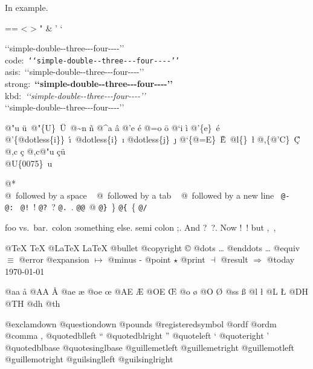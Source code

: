 \documentclass{book}
\makeatletter
\newcommand\GNUTexinfocommandstyletextkbd[1]{{\ttfamily\textsl{#1}}}%
\newenvironment{GNUTexinfopreformatted}{%
  \par\GNUTobeylines\obeyspaces\frenchspacing
  \parskip=\z@\parindent=\z@}{}
{\catcode`\^^M=13 \gdef\GNUTobeylines{\catcode`\^^M=13 \def^^M{\null\par}}}
\newenvironment{GNUTexinfoindented}
  {\begin{list}{}{}
  \item\relax}
  {\end{list}}
\makeatother
\begin{document}
In example.
\begin{GNUTexinfoindented}
\begin{GNUTexinfopreformatted}%
\ttfamily 
<
>
"
\&
'
`

{`}{`}simple-double{-}{-}three{-}{-}{-}four{-}{-}{-}-{'}{'}\leavevmode{}\\
code:\ \texttt{{`}{`}simple-double{-}{-}three{-}{-}{-}four{-}{-}{-}-{'}{'}}\ \leavevmode{}\\
asis:\ {`}{`}simple-double{-}{-}three{-}{-}{-}four{-}{-}{-}-{'}{'}\ \leavevmode{}\\
strong:\ \textbf{{`}{`}simple-double{-}{-}three{-}{-}{-}four{-}{-}{-}-{'}{'}}\ \leavevmode{}\\
kbd:\ \GNUTexinfocommandstyletextkbd{{`}{`}simple-double{-}{-}three{-}{-}{-}four{-}{-}{-}-{'}{'}}\ \leavevmode{}\\

`\hbox{}`simple-double-\hbox{}-three{-}{-}{-}four{-}{-}{-}-'\hbox{}'\leavevmode{}\\

%
%
%
%

@"u \"{u}\ 
@"\{U\}\ \"{U}\ 
@\~{}n \~{n}
@\^{}a \^{a}
@'e \'{e}
@=o \={o}
@`i \`{i}
@'\{e\}\ \'{e}
@'\{@dotless\{i\}\}\ \'{\i{}}\ 
@dotless\{i\}\ \i{}
@dotless\{j\}\ \j{}
@`\{@=E\}\ \`{\={E}}\ 
@l\{\}\ \l{}
@,\{@'C\}\ \c{\'{C}}
@,c \c{c}
@,c@"u \c{c}\"{u}\ \leavevmode{}\\

@U\{0075\}\ u

@* \leavevmode{}\\
@\ followed by a space
\ {}
@\ followed by a tab
\ {}
@\ followed by a new line
\ {}\texttt{@-}\ \-{}
\texttt{@:}\ \@
\texttt{@!}\ \@!
\texttt{@?}\ \@?
\texttt{@.}\ \@.
\texttt{@@}\ @
\texttt{@\}}\ \}
\texttt{@\{}\ \{
\texttt{@/}\ 

foo vs.\@\ bar.\ 
colon :\@And something else.
semi colon ;\@.
And ?\ ?\@.
Now !\ !\@@
but ,\ ,\@

@TeX \TeX{}
@LaTeX \LaTeX{}
@bullet \textbullet{}
@copyright \copyright{}
@dots \dots{}\@
@enddots \dots{}
@equiv $\equiv{}$
@error \fbox{error}
@expansion $\mapsto{}$
@minus -
@point $\star{}$
@print $\dashv{}$
@result $\Rightarrow{}$
@today \today{}

@aa \aa{}
@AA \AA{}
@ae \ae{}
@oe \oe{}
@AE \AE{}
@OE \OE{}
@o \o{}
@O \O{}
@ss \ss{}
@l \l{}
@L \L{}
@DH \DH{}
@TH \TH{}
@dh \dh{}
@th \th{}

@exclamdown \textexclamdown{}
@questiondown \textquestiondown{}
@pounds \textsterling{}
@registeredsymbol \circledR{}
@ordf \textordfeminine{}
@ordm \textordmasculine{}
@comma ,
@quotedblleft \textquotedblleft{}
@quotedblright \textquotedblright{}
@quoteleft \textquoteleft{}
@quoteright \textquoteright{}
@quotedblbase \quotedblbase{}
@quotesinglbase \quotesinglbase{}
@guillemetleft \guillemotleft{}
@guillemetright \guillemotright{}
@guillemotleft \guillemotleft{}
@guillemotright \guillemotright{}
@guilsinglleft \guilsinglleft{}
@guilsinglright \guilsinglright{}


\end{GNUTexinfopreformatted}
\end{GNUTexinfoindented}
\end{document}
